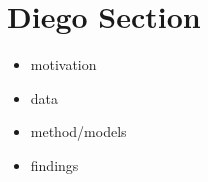 \section{Diego Section}
\begin{itemize}
\item motivation
\item data
\item method/models
\item findings
\end{itemize}